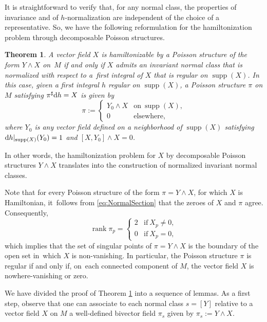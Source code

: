 \documentclass[10pt,a4paper]{amsart}
\newcommand{\dd}{{\rm d}}
\numberwithin{equation}{section}
\newtheorem{Theorem}{Theorem}[section]
\begin{document}
It is straightforward to verify that, for any normal class, the properties of invariance and of $h$-normalization are independent of the choice of a representative. So, we have the following reformulation for the hamiltonization problem through decomposable Poisson structures.


\begin{Theorem}\label{teo:NormalSection}
A vector field $X$ is \emph{hamiltonizable} by a Poisson structure of the form $Y \wedge X$ on~$M$ if and only if $X$ admits an invariant normal class that is normalized with respect to a~first integral of $X$ that is regular on $\operatorname{supp}(X)$. In this case, given a first integral $h$ regular on $\operatorname{supp}(X)$, a Poisson structure $\pi$ on $M$ satisfying $\pi^{\sharp}\dd h=X$ is given by
 \begin{equation}\label{eq:NormalSection}
 \pi:=\begin{cases}
 Y_0\wedge X & \text{on} \  \operatorname{supp}(X),
 \\
 0 & \text{elsewhere},
 \end{cases}
 \end{equation}
where $Y_0$ is any vector field defined on a neighborhood of $\operatorname{supp}(X)$ satisfying $\dd h|_{\operatorname{supp}(X)}(Y_0)=1$ and $[X,Y_{0}] \wedge X = 0$.
\end{Theorem}


In other words, the hamiltonization problem for $X$ by decomposable Poisson structures $Y \wedge X$ translates into the construction of normalized invariant normal classes.

Note that for every Poisson structure of the form $\pi = Y \wedge X$, for which $X$ is Hamiltonian, it~follows from \eqref{eq:NormalSection} that the zeroes of $X$ and $\pi$ agree. Consequently,
 \begin{equation*}
 \operatorname{rank}{\pi_{p}} =
\begin{cases}
 2 & \text{if} \  X_{p} \neq 0,
 \\
 0 & \text{if} \  X_{p} = 0,
 \end{cases}
 \end{equation*}
which implies that the set of singular points of $\pi=Y\wedge X$ is the boundary of the open set in~which $X$ is non-vanishing. In particular, the Poisson structure $\pi$ is regular if and only if, on~each connected component of $M$, the vector field $X$ is nowhere-vanishing or zero.

We have divided the proof of Theorem \ref{teo:NormalSection} into a sequence of lemmas. As a first step, observe that one can associate to each normal class $s = [Y]$ relative to a vector field $X$ on $M$ a well-defined bivector field $\pi_{s}$ given by $\pi_{s} := Y \wedge X$.
\end{document}
